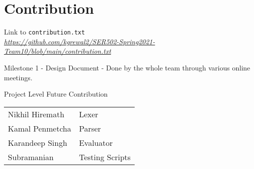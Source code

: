 \documentclass[12pt,letterpaper]{article}
\begin{document}
\section{Contribution}
Link to \texttt{contribution.txt}\\
\href{https://github.com/kgrewal2/SER502-Spring2021-Team10/blob/main/contribution.txt}{\textit{https://github.com/kgrewal2/SER502-Spring2021-Team10/blob/main/contribution.txt}}

Milestone 1
- Design Document - Done by the whole team through various online meetings.

Project Level Future Contribution\\
\begin{tabular}{ll}
    Nikhil Hiremath & Lexer\\
    Kamal Penmetcha & Parser\\
    Karandeep Singh & Evaluator\\
    Subramanian     & Testing Scripts
\end{tabular}
\end{document}
